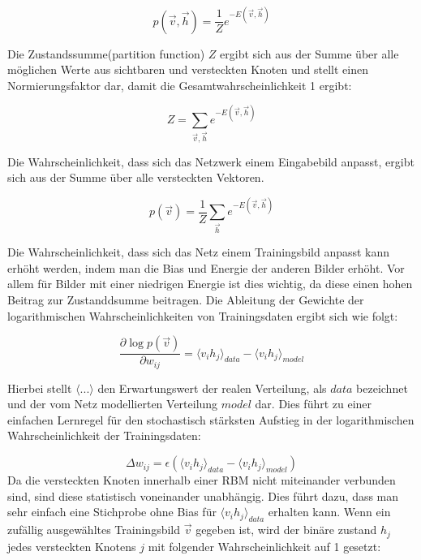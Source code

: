 \documentclass[12pt]{article}
\begin{document}
\begin{equation}
p(\vec{v},\vec{h})= \frac{1}{Z} e^{-E(\vec{v},\vec{h})}
\end{equation}

Die Zustandssumme(partition function) $Z$ ergibt sich aus der Summe über alle möglichen Werte aus sichtbaren und versteckten Knoten und stellt einen Normierungsfaktor dar, damit die Gesamtwahrscheinlichkeit 1 ergibt:

\begin{equation}
Z=\sum_{\vec{v},\vec{h}} e^{-E(\vec{v},\vec{h})}
\end{equation}

Die Wahrscheinlichkeit, dass sich das Netzwerk einem Eingabebild anpasst, ergibt sich aus der Summe über alle versteckten Vektoren. \cite{guide}

\begin{equation}
p(\vec{v})= \frac{1}{Z} \sum_{\vec{h}} e^{-E(\vec{v},\vec{h})}
\end{equation}

Die Wahrscheinlichkeit, dass sich das Netz einem Trainingsbild anpasst kann erhöht werden, indem man die Bias und Energie der anderen Bilder erhöht. Vor allem für Bilder mit einer niedrigen Energie ist dies wichtig, da diese einen hohen Beitrag zur Zustanddsumme beitragen. Die Ableitung der Gewichte der logarithmischen Wahrscheinlichkeiten von Trainingsdaten ergibt sich wie folgt:

\begin{equation}
\frac{\partial \log p(\vec{v})}{\partial w_{ij}} = \langle v_ih_j \rangle_{data} - \langle v_i h_j \rangle_{model}
\end{equation}

Hierbei stellt $\langle...\rangle$ den Erwartungswert der realen Verteilung, als $data$ bezeichnet und der vom Netz modellierten Verteilung $model$ dar.  Dies führt zu einer einfachen Lernregel für den stochastisch stärksten Aufstieg in der logarithmischen Wahrscheinlichkeit der Trainingsdaten:

\begin{equation}
\Delta w_{ij} = \epsilon\left( \langle v_i h_j \rangle_{data} - \langle v_i h_j \rangle_{model} \right)
\end{equation}
Da die versteckten Knoten innerhalb einer RBM nicht miteinander verbunden sind, sind diese statistisch voneinander unabhängig. Dies führt dazu, dass man sehr einfach eine Stichprobe ohne Bias für $\langle v_i h_j \rangle_{data}$ erhalten kann. Wenn ein zufällig ausgewähltes Trainingsbild $\vec{v}$ gegeben ist, wird der binäre zustand $h_j$ jedes versteckten Knotens $j$ mit folgender Wahrscheinlichkeit auf 1 gesetzt:
\end{document}
